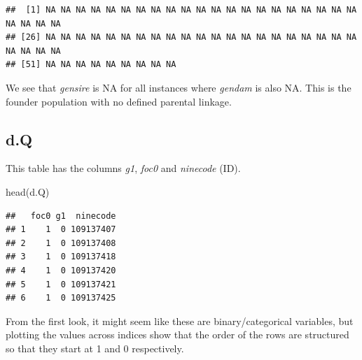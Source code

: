 \documentclass[
]{article}
\newenvironment{Shaded}{\begin{snugshade}}{\end{snugshade}}
\newcommand{\AttributeTok}[1]{\textcolor[rgb]{0.77,0.63,0.00}{#1}}
\newcommand{\DecValTok}[1]{\textcolor[rgb]{0.00,0.00,0.81}{#1}}
\newcommand{\FunctionTok}[1]{\textcolor[rgb]{0.00,0.00,0.00}{#1}}
\newcommand{\NormalTok}[1]{#1}
\newcommand{\SpecialCharTok}[1]{\textcolor[rgb]{0.00,0.00,0.00}{#1}}
\newcommand{\StringTok}[1]{\textcolor[rgb]{0.31,0.60,0.02}{#1}}
\begin{document}
\begin{verbatim}
##  [1] NA NA NA NA NA NA NA NA NA NA NA NA NA NA NA NA NA NA NA NA NA NA NA NA NA
## [26] NA NA NA NA NA NA NA NA NA NA NA NA NA NA NA NA NA NA NA NA NA NA NA NA NA
## [51] NA NA NA NA NA NA NA NA NA
\end{verbatim}

We see that \emph{gensire} is NA for all instances where \emph{gendam}
is also NA. This is the founder population with no defined parental
linkage.

\hypertarget{d.q}{%
\subsection*{d.Q}\label{d.q}}

This table has the columns \emph{g1}, \emph{foc0} and \emph{ninecode}
(ID).

\begin{Shaded}
\begin{Highlighting}[]
\FunctionTok{head}\NormalTok{(d.Q)}
\end{Highlighting}
\end{Shaded}

\begin{verbatim}
##   foc0 g1  ninecode
## 1    1  0 109137407
## 2    1  0 109137408
## 3    1  0 109137418
## 4    1  0 109137420
## 5    1  0 109137421
## 6    1  0 109137425
\end{verbatim}

From the first look, it might seem like these are binary/categorical
variables, but plotting the values across indices show that the order of
the rows are structured so that they start at 1 and 0 respectively.

\begin{Shaded}
\end{Shaded}
\end{document}
